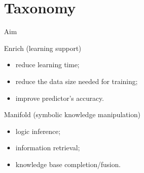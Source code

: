 \documentclass[presentation]{beamer}\mode<presentation>{\usetheme{AMSBolognaFC}}
\begin{document}
\section{Taxonomy}

\begin{frame}[c]{Aim}
    \begin{block}{Enrich (learning support)}
        \begin{itemize}
            \item reduce learning time;
            \item reduce the data size needed for training;
            \item improve predictor's accuracy.
        \end{itemize}
    \end{block}
    \begin{block}{Manifold (symbolic knowledge manipulation)}
        \begin{itemize}
            \item logic inference;
            \item information retrieval;
            \item knowledge base completion/fusion.
        \end{itemize}
    \end{block}
\end{frame}
\end{document}
